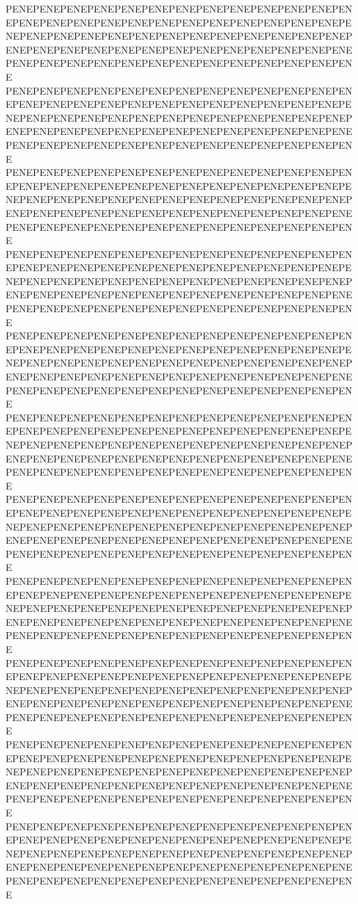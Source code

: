 PENEPENEPENEPENEPENEPENEPENEPENEPENEPENEPENEPENEPENEPENEPENEPENEPENEPENEPENEPENEPENEPENEPENEPENEPENEPENEPENEPENEPENEPENEPENEPENEPENEPENEPENEPENEPENEPENEPENEPENEPENEPENEPENEPENEPENEPENEPENEPENEPENEPENEPENEPENEPENEPENEPENEPENEPENEPENEPENEPENEPENEPENEPENEPENE
PENEPENEPENEPENEPENEPENEPENEPENEPENEPENEPENEPENEPENEPENEPENEPENEPENEPENEPENEPENEPENEPENEPENEPENEPENEPENEPENEPENEPENEPENEPENEPENEPENEPENEPENEPENEPENEPENEPENEPENEPENEPENEPENEPENEPENEPENEPENEPENEPENEPENEPENEPENEPENEPENEPENEPENEPENEPENEPENEPENEPENEPENEPENEPENE
PENEPENEPENEPENEPENEPENEPENEPENEPENEPENEPENEPENEPENEPENEPENEPENEPENEPENEPENEPENEPENEPENEPENEPENEPENEPENEPENEPENEPENEPENEPENEPENEPENEPENEPENEPENEPENEPENEPENEPENEPENEPENEPENEPENEPENEPENEPENEPENEPENEPENEPENEPENEPENEPENEPENEPENEPENEPENEPENEPENEPENEPENEPENEPENE
PENEPENEPENEPENEPENEPENEPENEPENEPENEPENEPENEPENEPENEPENEPENEPENEPENEPENEPENEPENEPENEPENEPENEPENEPENEPENEPENEPENEPENEPENEPENEPENEPENEPENEPENEPENEPENEPENEPENEPENEPENEPENEPENEPENEPENEPENEPENEPENEPENEPENEPENEPENEPENEPENEPENEPENEPENEPENEPENEPENEPENEPENEPENEPENE
PENEPENEPENEPENEPENEPENEPENEPENEPENEPENEPENEPENEPENEPENEPENEPENEPENEPENEPENEPENEPENEPENEPENEPENEPENEPENEPENEPENEPENEPENEPENEPENEPENEPENEPENEPENEPENEPENEPENEPENEPENEPENEPENEPENEPENEPENEPENEPENEPENEPENEPENEPENEPENEPENEPENEPENEPENEPENEPENEPENEPENEPENEPENEPENE
PENEPENEPENEPENEPENEPENEPENEPENEPENEPENEPENEPENEPENEPENEPENEPENEPENEPENEPENEPENEPENEPENEPENEPENEPENEPENEPENEPENEPENEPENEPENEPENEPENEPENEPENEPENEPENEPENEPENEPENEPENEPENEPENEPENEPENEPENEPENEPENEPENEPENEPENEPENEPENEPENEPENEPENEPENEPENEPENEPENEPENEPENEPENEPENE
PENEPENEPENEPENEPENEPENEPENEPENEPENEPENEPENEPENEPENEPENEPENEPENEPENEPENEPENEPENEPENEPENEPENEPENEPENEPENEPENEPENEPENEPENEPENEPENEPENEPENEPENEPENEPENEPENEPENEPENEPENEPENEPENEPENEPENEPENEPENEPENEPENEPENEPENEPENEPENEPENEPENEPENEPENEPENEPENEPENEPENEPENEPENEPENE
PENEPENEPENEPENEPENEPENEPENEPENEPENEPENEPENEPENEPENEPENEPENEPENEPENEPENEPENEPENEPENEPENEPENEPENEPENEPENEPENEPENEPENEPENEPENEPENEPENEPENEPENEPENEPENEPENEPENEPENEPENEPENEPENEPENEPENEPENEPENEPENEPENEPENEPENEPENEPENEPENEPENEPENEPENEPENEPENEPENEPENEPENEPENEPENE
PENEPENEPENEPENEPENEPENEPENEPENEPENEPENEPENEPENEPENEPENEPENEPENEPENEPENEPENEPENEPENEPENEPENEPENEPENEPENEPENEPENEPENEPENEPENEPENEPENEPENEPENEPENEPENEPENEPENEPENEPENEPENEPENEPENEPENEPENEPENEPENEPENEPENEPENEPENEPENEPENEPENEPENEPENEPENEPENEPENEPENEPENEPENEPENE
PENEPENEPENEPENEPENEPENEPENEPENEPENEPENEPENEPENEPENEPENEPENEPENEPENEPENEPENEPENEPENEPENEPENEPENEPENEPENEPENEPENEPENEPENEPENEPENEPENEPENEPENEPENEPENEPENEPENEPENEPENEPENEPENEPENEPENEPENEPENEPENEPENEPENEPENEPENEPENEPENEPENEPENEPENEPENEPENEPENEPENEPENEPENEPENE
PENEPENEPENEPENEPENEPENEPENEPENEPENEPENEPENEPENEPENEPENEPENEPENEPENEPENEPENEPENEPENEPENEPENEPENEPENEPENEPENEPENEPENEPENEPENEPENEPENEPENEPENEPENEPENEPENEPENEPENEPENEPENEPENEPENEPENEPENEPENEPENEPENEPENEPENEPENEPENEPENEPENEPENEPENEPENEPENEPENEPENEPENEPENEPENE

